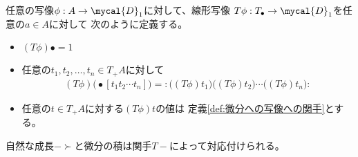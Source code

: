 \begin{definition}[微分への写像の関手の拡張]\label{def:微分への写像への関手の拡張} %
任意の写像$\phi:A\to\mycal{D}_1$に対して、線形写像
$T\phi:T_\bullet\to\mycal{D}_1$を任意の$a\in A$に対して
次のように定義する。
\begin{itemize}\setlength{\itemsep}{-1mm} %
	\item $(T\phi)\bullet = 1$
	\item 任意の$t_1,t_2,\dots,t_n\in T_+A$に対して
	\begin{equation*}\begin{split} %
		(T\phi)\bigl(\bullet[t_1t_2\cdots t_n]\bigr)
		= :\bigl((T\phi)t_1\bigr)\bigl((T\phi)t_2\bigr)
			\cdots\bigl((T\phi)t_n\bigr):
	\end{split}\end{equation*} %
	\item 任意の$t\in T_+A$に対する$(T\phi)t$の値は
	定義\ref{def:微分への写像への関手}とする。
\end{itemize} %
\end{definition} %

自然な成長$-\succ$と微分の積は関手$T-$によって対応付けられる。

